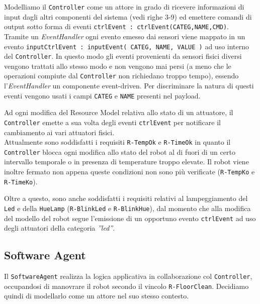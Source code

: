 \documentclass{../llncs}
\newcommand{\codescript}[1]{{\mbox{\small{\texttt{#1}}}}\xspace}
\newcommand{\code}[1]{{\color{blue}\small{\texttt{#1}}}}
\begin{document}
Modelliamo il \texttt{Controller} come un attore in grado di ricevere informazioni di input dagli altri componenti del sistema (vedi righe 3-9) ed emettere comandi di output sotto forma di eventi \codescript{ctrlEvent : ctrlEvent(CATEG,NAME,CMD)}.\\



Tramite un \emph{EventHandler} ogni evento emesso dai sensori viene mappato in un evento \codescript{inputCtrlEvent : inputEvent( CATEG, NAME, VALUE )} ad uso interno del \texttt{Controller}. In questo modo gli eventi provenienti da sensori fisici diversi vengono trattati allo stesso modo e non vengono mai persi (a meno che le operazioni compiute dal \texttt{Controller} non richiedano troppo tempo), essendo l'\emph{EventHandler} un componente event-driven. Per discriminare la natura di questi eventi vengono usati i campi \codescript{CATEG} e \codescript{NAME} presenti nel payload.

Ad ogni modifica del Resource Model relativa allo stato di un attuatore, il \texttt{Controller} emette a sua volta degli eventi \codescript{ctrlEvent} per notificare il cambiamento ai vari attuatori fisici.\\



Attualmente sono soddisfatti i requisiti \code{R-TempOk} e \code{R-TimeOk} in quanto il \texttt{Controller} blocca ogni modifica allo stato del robot al di fuori di un certo intervallo temporale o in presenza di temperature troppo elevate. Il robot viene inoltre fermato non appena queste condizioni non sono più verificate (\code{R-TempKo} e \code{R-TimeKo}).

Oltre a questo, sono anche soddisfatti i requisiti relativi al lampeggiamento del \texttt{Led} e della \texttt{HueLamp} (\code{R-BlinkLed} e \code{R-BlinkHue}), dal momento che alla modifica del modello del robot segue l'emissione di un opportuno evento \codescript{ctrlEvent} ad uso degli attuatori della categoria \emph{''led''}.

\subsection{Software Agent}
Il \texttt{SoftwareAgent} realizza la logica applicativa in collaborazione col \texttt{Controller}, occupandosi di manovrare il robot secondo il vincolo \code{R-FloorClean}. Decidiamo quindi di modellarlo come un attore nel suo stesso contesto.
\end{document}
